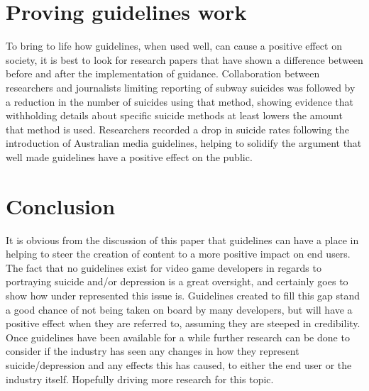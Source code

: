 \documentclass{scrartcl}
\begin{document}
	\section{Proving guidelines work}
		To bring to life how guidelines, when used well, can cause a positive effect on society, it is best to look for research papers that have shown a difference between before and after the implementation of guidance.
		Collaboration between researchers and journalists limiting reporting of subway suicides was followed by a reduction in the number of suicides using that method\cite{etzersdorfer1998preventing}, showing evidence that withholding details about specific suicide methods at least lowers the amount that method is used. 
		Researchers recorded a drop in suicide rates following the introduction of Australian media guidelines\cite{niederkrotenthaler2007assessing}, helping to solidify the argument that well made guidelines have a positive effect on the public. 
		
	\section{Conclusion}
		It is obvious from the discussion of this paper that guidelines can have a place in helping to steer the creation of content to a more positive impact on end users. The fact that no guidelines exist for video game developers in regards to portraying suicide and/or depression is a great oversight, and certainly goes to show how under represented this issue is. 
		Guidelines created to fill this gap stand a good chance of not being taken on board by many developers, but will have a positive effect when they are referred to, assuming they are steeped in credibility. Once guidelines have been available for a while further research can be done to consider if the industry has seen any changes in how they represent suicide/depression and any effects this has caused, to either the end user or the industry itself. Hopefully driving more research for this topic. 
		
	
	
	
\end{document}
